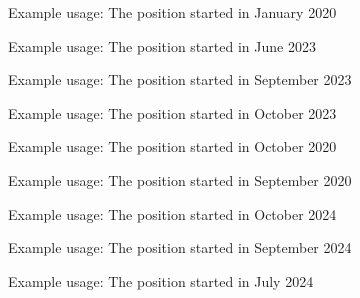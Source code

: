 \documentclass{article}
\begin{document}
Example usage: The position started in January 2020


Example usage: The position started in June 2023


Example usage: The position started in September 2023


Example usage: The position started in October 2023



Example usage: The position started in October 2020


Example usage: The position started in September 2020


Example usage: The position started in October 2024


Example usage: The position started in September 2024


Example usage: The position started in July 2024

\end{document}
